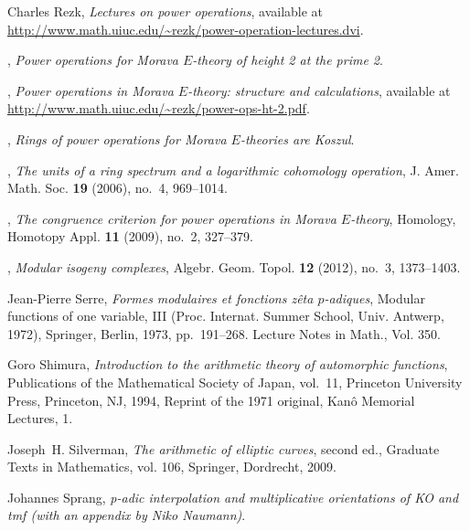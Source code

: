 \documentclass{gtpart}
\theoremstyle{definition}
\theoremstyle{remark}
\renewcommand{\=}{\approx}
\renewcommand{\-}{\sim}
\numberwithin{equation}{section}
\numberwithin{thm}{section}
\begin{document}
\begin{thebibliography}
Charles Rezk, \emph{Lectures on power operations}, 
  available at \href{http://www.math.uiuc.edu/~rezk/power-operation-lectures.dvi}{http://www.math.uiuc.edu\linebreak/\textasciitilde rezk/power-operation-lectures.dvi}.

\bysame, \emph{Power operations for {M}orava {$E$}-theory of height 2 at the
  prime 2}. 

\bysame, \emph{Power operations in {M}orava {$E$}-theory: structure and
  calculations},
  available at \href{http://www.math.uiuc.edu/~rezk/power-ops-ht-2.pdf}{http://www.math.uiuc.edu/\textasciitilde rezk/power-ops-ht-2.pdf}.

\bysame, \emph{Rings of power operations for {M}orava {$E$}-theories are
  {K}oszul}. 

\bysame, \emph{The units of a ring spectrum and a logarithmic cohomology
  operation}, J. Amer. Math. Soc. \textbf{19} (2006), no.~4, 969--1014.

\bysame, \emph{The congruence criterion for power operations in {M}orava
  {$E$}-theory}, Homology, Homotopy Appl. \textbf{11} (2009), no.~2, 327--379.

\bysame, \emph{Modular isogeny complexes}, Algebr. Geom. Topol. \textbf{12}
  (2012), no.~3, 1373--1403. 

Jean-Pierre Serre, \emph{Formes modulaires et fonctions z\^eta {$p$}-adiques},
  Modular functions of one variable, {III} ({P}roc. {I}nternat. {S}ummer
  {S}chool, {U}niv. {A}ntwerp, 1972), Springer, Berlin, 1973, pp.~191--268.
  Lecture Notes in Math., Vol. 350. 

Goro Shimura, \emph{Introduction to the arithmetic theory of automorphic
  functions}, Publications of the Mathematical Society of Japan, vol.~11,
  Princeton University Press, Princeton, NJ, 1994, Reprint of the 1971
  original, Kan{\^o} Memorial Lectures, 1. 

Joseph~H. Silverman, \emph{The arithmetic of elliptic curves}, second ed.,
  Graduate Texts in Mathematics, vol. 106, Springer, Dordrecht, 2009.

Johannes Sprang, \emph{p-adic interpolation and multiplicative orientations of
  {KO} and tmf (with an appendix by {N}iko {N}aumann)}. 


\end{thebibliography}
\end{document}

